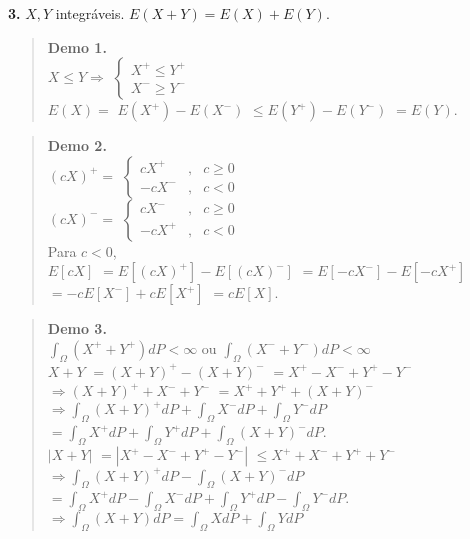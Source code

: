 \documentclass[
]{book}
\begin{document}
\textbf{3.} \(X,Y\) integráveis. \(E(X+Y) = E(X) + E(Y)\).

\begin{quote}
\textbf{Demo 1.}\\
\(X \leq Y \Rightarrow\) \(\left\{\begin{array}{c}X^+ \leq Y^+\\ X^- \geq Y^-\end{array}\right.\)\\
\(E(X) =\) \(E(X^+) - E(X^-)\) \(\leq E(Y^+) - E(Y^-)\) \(=E(Y).\)
\end{quote}

\begin{quote}
\textbf{Demo 2.}\\
\((cX)^+ =\) \(\left\{\begin{array}{rcl}cX^+ &,& c \geq 0\\ -cX^- &,& c < 0 \end{array}\right.\)\\
\((cX)^- =\) \(\left\{\begin{array}{rcl}cX^- &,& c \geq 0\\ -cX^+ &,& c < 0 \end{array}\right.\)\\
Para \(c<0\),\\
\(E[cX]\) \(= E[(cX)^+] - E[(cX)^-]\) \(= E[-cX^-] - E[-cX^+]\) \(= -cE[X^-] + cE[X^+]\) \(= cE[X]\).
\end{quote}

\begin{quote}
\textbf{Demo 3.}\\
\(\displaystyle\int_\Omega \left(X^+ + Y^+\right) dP < \infty\) ou \(\displaystyle\int_\Omega \left(X^- + Y^-\right) dP < \infty\)\\
\(X + Y\) \(= (X + Y)^+ - (X+Y)^-\) \(= X^+ - X^- + Y^+ - Y^-\)\\
\(\Rightarrow (X+Y)^+ + X^- + Y^-\) \(= X^+ + Y^+ + (X+Y)^-\)\\
\(\Rightarrow \displaystyle\int_\Omega (X+Y)^+dP + \int_\Omega X^-dP + \int_\Omega Y^-dP\)\\
\(=\displaystyle\int_\Omega X^+dP + \int_\Omega Y^+dP + \int_\Omega (X+Y)^-dP\).\\
\(|X+Y|\) \(= |X^+-X^-+Y^+-Y^-|\) \(\leq X^++X^-+Y^++Y^-\)\\
\(\Rightarrow \displaystyle\int_\Omega (X+Y)^+dP - \int_\Omega(X+Y)^-dP\) \(=\displaystyle \int_\Omega X^+dP -\int_\Omega X^-dP + \int_\Omega Y^+dP -\int_\Omega Y^-dP\).\\
\(\Rightarrow \displaystyle\int_\Omega(X+Y)dP = \int_\Omega XdP + \int_\Omega YdP\)
\end{quote}
\end{document}
